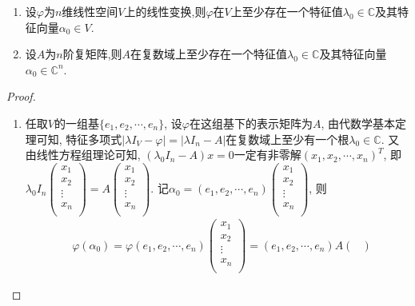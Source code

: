 \documentclass[../../main.tex]{subfiles}
\begin{document}
\begin{proposition}\label{proposition:线性变换或矩阵在复线性空间上至少存在一个特征值及与其特征向量}
\begin{enumerate}
\item 设$\varphi$为$n$维线性空间$V$上的线性变换,则$\varphi$在$V$上至少存在一个特征值$\lambda_0\in\mathbb{C}$及其特征向量$\alpha_0\in V$.

\item 设$A$为$n$阶复矩阵,则$A$在复数域上至少存在一个特征值$\lambda_0\in\mathbb{C}$及其特征向量$\alpha_0\in\mathbb{C}^n$.
\end{enumerate}
\end{proposition}
\begin{proof}
\begin{enumerate}
\item 任取\(V\)的一组基\(\{ e_1,e_2,\cdots ,e_n \}\), 设\(\varphi\)在这组基下的表示矩阵为\(A\), 由代数学基本定理可知, 特征多项式\(|\lambda I_V - \varphi| = |\lambda I_n - A|\)在复数域上至少有一个根\(\lambda_0\in \mathbb{C}\). 又由线性方程组理论可知, \((\lambda_0I_n - A)x = 0\)一定有非零解\((x_1,x_2,\cdots ,x_n)^T\), 即\(\lambda_0I_n\begin{pmatrix}
    x_1\\
    x_2\\
    \vdots\\
    x_n\\
    \end{pmatrix}=A\begin{pmatrix}
    x_1\\
    x_2\\
    \vdots\\
    x_n\\
    \end{pmatrix}\). 记\(\alpha_0 = (e_1,e_2,\cdots ,e_n)\begin{pmatrix}
    x_1\\
    x_2\\
    \vdots\\
    x_n\\
    \end{pmatrix}\), 则
    \begin{align*}
    &\varphi(\alpha_0)=\varphi(e_1,e_2,\cdots ,e_n)\begin{pmatrix}
    x_1\\
    x_2\\
    \vdots\\
    x_n\\
    \end{pmatrix}=(e_1,e_2,\cdots ,e_n)A\begin{pmatrix}

\end{pmatrix}
\end{align*}
\end{enumerate}
\end{proof}
\end{document}
